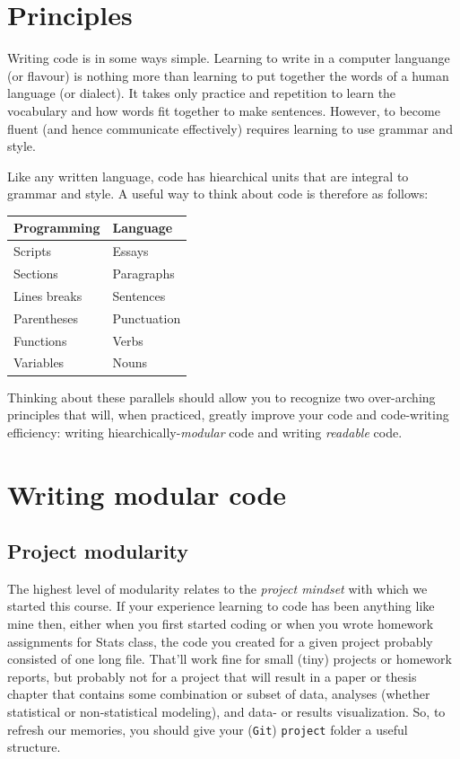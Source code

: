 \documentclass[12pt,letterpaper]{article}
\begin{document}
\section{Principles}

Writing code is in some ways simple.
Learning to write in a computer languange (or flavour) is nothing more than learning to put together the words of a human language (or dialect).
It takes only practice and repetition to learn the vocabulary and how words fit together to make sentences.
However, to become fluent (and hence communicate effectively) requires learning to use grammar and style.

Like any written language, code has hiearchical units that are integral to grammar and style.
A useful way to think about code is therefore as follows:

\begin{center}
\begin{tabular}{ll}
	\hline
	Programming	& Language\\
	\hline
	Scripts	& Essays\\
	Sections & Paragraphs\\
	Lines breaks & Sentences\\
	Parentheses & Punctuation\\
	Functions & Verbs\\
	Variables & Nouns\\
	\hline
\end{tabular}
\end{center}
\noindent
Thinking about these parallels should allow you to recognize two over-arching principles that will, when practiced, greatly improve your code and code-writing efficiency:
writing hiearchically-\emph{modular} code and writing \emph{readable} code.




\section{Writing modular code}

\subsection{Project modularity}

The highest level of modularity relates to the \emph{project mindset} with which we started this course.
If your experience learning to code has been anything like mine then, either when you first started coding or when you wrote homework assignments for Stats class,
the code you created for a given project probably consisted of one long file.
That'll work fine for small (tiny) projects or homework reports,
but probably not for a project that will result in a paper or thesis chapter that contains some combination or subset of data,
analyses (whether statistical or non-statistical modeling),
and data- or results visualization.  So, to refresh our memories, you should give your (\texttt{Git}) \texttt{project} folder a useful structure.
\end{document}
